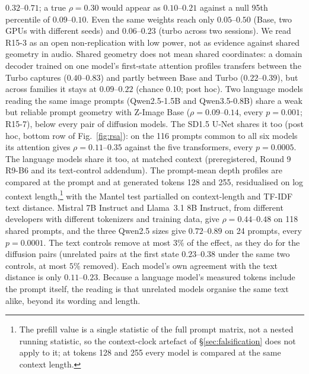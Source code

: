 \documentclass[11pt]{article}
\begin{document}
$0.32$--$0.71$; a true $\rho=0.30$ would appear as $0.10$--$0.21$ against a null 95th percentile of $0.09$--$0.10$. Even the same weights reach only $0.05$--$0.50$ (Base, two GPUs with different seeds) and $0.06$--$0.23$ (turbo across two sessions). We read R15-3 as an open non-replication with low power, not as evidence against shared geometry in audio. Shared geometry does not mean shared coordinates: a domain decoder trained on one model's first-state attention profiles transfers between the Turbo captures ($0.40$--$0.83$) and partly between Base and Turbo ($0.22$--$0.39$), but across families it stays at $0.09$--$0.22$ (chance $0.10$; post hoc). Two language models reading the same image prompts (Qwen2.5-1.5B and Qwen3.5-0.8B) share a weak but reliable prompt geometry with Z-Image Base ($\rho=0.09$--$0.14$, every $p=0.001$; R15-7), below every pair of diffusion models. The SD1.5 U-Net shares it too (post hoc, bottom row of Fig.~\ref{fig:rsa}): on the 116 prompts common to all six models its attention gives $\rho=0.11$--$0.35$ against the five transformers, every $p=0.0005$. The language models share it too, at matched context (preregistered, Round 9 R9-B6 and its text-control addendum). The prompt-mean depth profiles are compared at the prompt and at generated tokens 128 and 255, residualised on log context length,\footnote{The prefill value is a single statistic of the full prompt matrix, not a nested running statistic, so the context-clock artefact of \S\ref{sec:falsification} does not apply to it; at tokens 128 and 255 every model is compared at the same context length.} with the Mantel test partialled on context-length and TF-IDF text distance. Mistral 7B Instruct and Llama~3.1 8B Instruct, from different developers with different tokenizers and training data, give $\rho=0.44$--$0.48$ on 118 shared prompts, and the three Qwen2.5 sizes give $0.72$--$0.89$ on 24 prompts, every $p=0.0001$. The text controls remove at most $3\%$ of the effect, as they do for the diffusion pairs (unrelated pairs at the first state $0.23$--$0.38$ under the same two controls, at most $5\%$ removed). Each model's own agreement with the text distance is only $0.11$--$0.23$. Because a language model's measured tokens include the prompt itself, the reading is that unrelated models organise the same text alike, beyond its wording and length.
\end{document}
